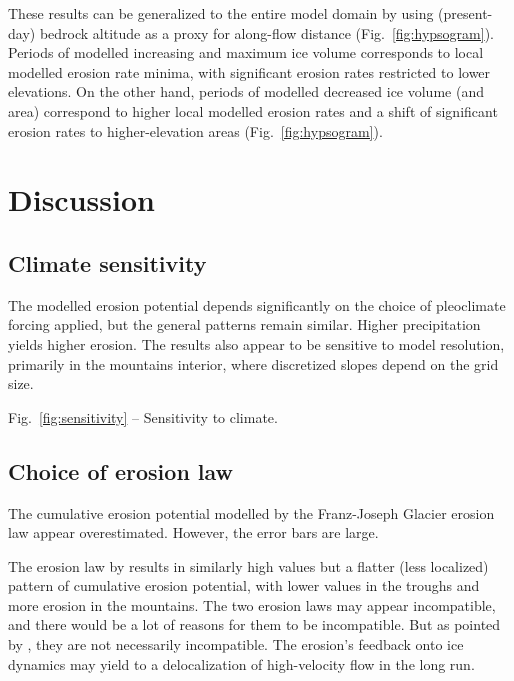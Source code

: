 \documentclass[utf8]{article}
\begin{document}
    These results can be generalized to the entire model domain by using
    (present-day) bedrock altitude as a proxy for along-flow distance
    (Fig.~\ref{fig:hypsogram}). Periods of modelled increasing and maximum ice
    volume corresponds to local modelled erosion rate minima, with significant
    erosion rates restricted to lower elevations. On the other hand, periods of
    modelled decreased ice volume (and area) correspond to higher local
    modelled erosion rates and a shift of significant erosion rates to
    higher-elevation areas (Fig.~\ref{fig:hypsogram}).


\section{Discussion}

\subsection{Climate sensitivity}
\label{sec:sensitivity}

    The modelled erosion potential depends significantly on the choice of
    pleoclimate forcing applied, but the general patterns remain similar.
    Higher precipitation yields higher erosion. The results also appear to be
    sensitive to model resolution, primarily in the mountains interior, where
    discretized slopes depend on the grid size.

    Fig.~\ref{fig:sensitivity} -- Sensitivity to climate.

\subsection{Choice of erosion law}
\label{sec:powerlaws}

    The cumulative erosion potential modelled by the Franz-Joseph Glacier
    erosion law \citep{Herman.etal.2015} appear overestimated. However, the
    error bars are large.

    The erosion law by \citet{Cook.etal.2020} results in similarly high values
    but a flatter (less localized) pattern of cumulative erosion potential,
    with lower values in the troughs and more erosion in the mountains. The two
    erosion laws may appear incompatible, and there would be a lot of reasons
    for them to be incompatible. But as pointed by \citet{Cook.etal.2020}, they
    are not necessarily incompatible. The erosion's feedback onto ice dynamics
    may yield to a delocalization of high-velocity flow in the long run.
\end{document}
